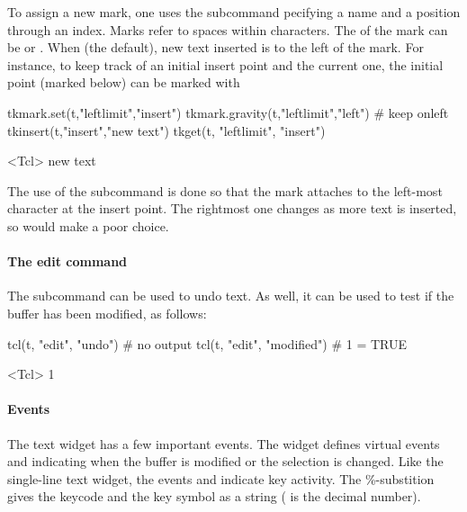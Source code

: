 To assign a new mark, one uses the  subcommand pecifying a name and a position through an index. Marks refer to spaces within characters. The  of the mark can be  or . When  (the default), new text inserted is to the left of the mark. For instance, to keep track of an initial insert point and the current one, the initial point (marked  below) can be marked with
\begin{Schunk}
\begin{Sinput}
 tkmark.set(t,"leftlimit","insert")
 tkmark.gravity(t,"leftlimit","left")    # keep onleft
 tkinsert(t,"insert","new text")
 tkget(t, "leftlimit", "insert")
\end{Sinput}
\begin{Soutput}
<Tcl> new text 
\end{Soutput}
\end{Schunk}
The use of the subcommand  is done so that the mark attaches to the left-most character at the insert point. The rightmost one changes as more text is inserted, so would make a poor choice. 


\paragraph{The edit command}
The subcommand  can be used to undo text. As well, it can be used to test if the buffer has been modified, as follows:
\begin{Schunk}
\begin{Sinput}
 tcl(t, "edit", "undo")                  # no output
 tcl(t, "edit", "modified")              # 1 = TRUE
\end{Sinput}
\begin{Soutput}
<Tcl> 1 
\end{Soutput}
\end{Schunk}



\paragraph{Events}
The text widget has a few important events. 
The widget defines virtual events  and  indicating when the buffer is modified or the selection is changed. Like the single-line text widget, the events  and  indicate key activity. The \%-substition  gives the keycode and  the key symbol as a string ( is the decimal number).



